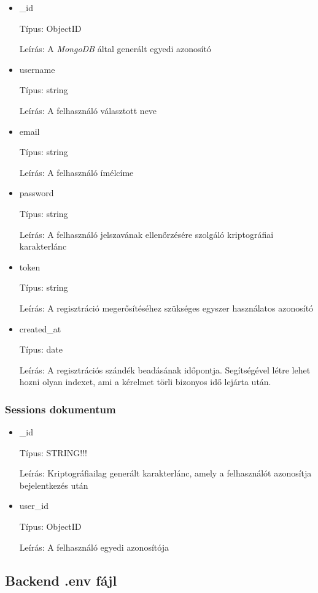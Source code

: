 \begin{itemize}
      \item \_id

            Típus: ObjectID

            Leírás: A \emph{MongoDB} által generált egyedi azonosító
      \item username

            Típus: string

            Leírás: A felhasználó választott neve
      \item email

            Típus: string

            Leírás: A felhasználó ímélcíme
      \item password

            Típus: string

            Leírás: A felhasználó jelszavának ellenőrzésére szolgáló kriptográfiai karakterlánc
      \item token

            Típus: string

            Leírás: A regisztráció megerősítéséhez szükséges egyszer használatos azonosító
      \item created\_at

            Típus: date

            Leírás: A regisztrációs szándék beadásának időpontja. Segítségével létre lehet hozni olyan indexet, ami a kérelmet törli bizonyos idő lejárta után.
\end{itemize}
\subsubsection{Sessions dokumentum}

\begin{itemize}
      \item \_id

            Típus: STRING!!!

            Leírás: Kriptográfiailag generált karakterlánc, amely a felhasználót azonosítja bejelentkezés után
      \item user\_id

            Típus: ObjectID

            Leírás: A felhasználó egyedi azonosítója
\end{itemize}


\subsection{Backend .env fájl}

